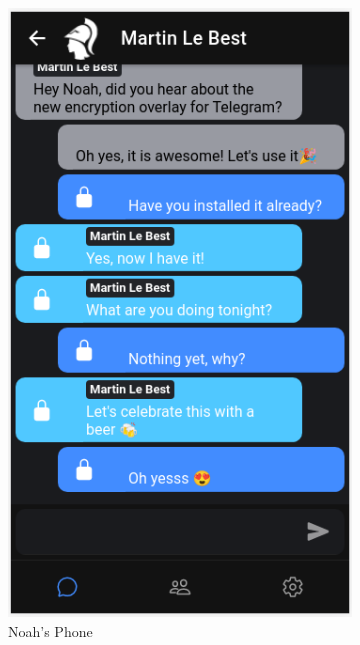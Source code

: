 \documentclass[a4paper, oneside]{discothesis}
\begin{document}
\begin{figure}[h]
\begin{subfigure}{.5\textwidth}
  \label{fig:chat_martin}
\end{subfigure}%
\begin{subfigure}{.5\textwidth}
  \centering
  \includegraphics[width=.8\linewidth]{figures/chat_noah.png}
  \caption{Noah's Phone}
  \label{fig:chat_noah}
\end{subfigure}
\begin{subfigure}{.5\textwidth}
  \centering

\end{subfigure}
\end{figure}
\end{document}
